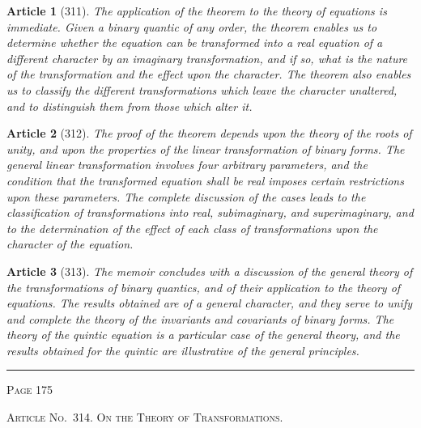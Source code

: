 \documentclass[11pt,a4paper]{article}
\theoremstyle{cayley}
\newtheorem{art}{Article}
\begin{document}
\begin{art}[311]
The application of the theorem to the theory of equations is immediate. Given a binary quantic of any order, the theorem enables us to determine whether the equation can be transformed into a real equation of a different character by an imaginary transformation, and if so, what is the nature of the transformation and the effect upon the character. The theorem also enables us to classify the different transformations which leave the character unaltered, and to distinguish them from those which alter it.
\end{art}

\begin{art}[312]
The proof of the theorem depends upon the theory of the roots of unity, and upon the properties of the linear transformation of binary forms. The general linear transformation involves four arbitrary parameters, and the condition that the transformed equation shall be real imposes certain restrictions upon these parameters. The complete discussion of the cases leads to the classification of transformations into real, subimaginary, and superimaginary, and to the determination of the effect of each class of transformations upon the character of the equation.
\end{art}

\begin{art}[313]
The memoir concludes with a discussion of the general theory of the transformations of binary quantics, and of their application to the theory of equations. The results obtained are of a general character, and they serve to unify and complete the theory of the invariants and covariants of binary forms. The theory of the quintic equation is a particular case of the general theory, and the results obtained for the quintic are illustrative of the general principles.
\end{art}

\vspace{2em}
\noindent\rule{\textwidth}{0.4pt}
\begin{center}\textsc{Page 175}\end{center}
\newpage

\begin{center}
\textsc{Article No.\ 314. On the Theory of Transformations.}
\end{center}
\end{document}

